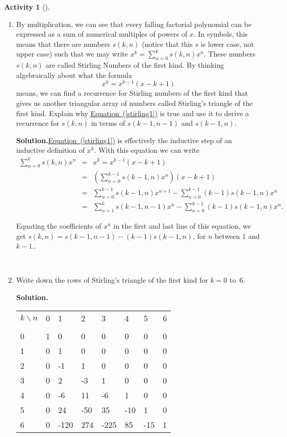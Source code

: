 \documentclass[10pt,]{book}
\theoremstyle{plain}
\theoremstyle{definition}
\newtheorem{activity}[project]{Activity}
\numberwithin{equation}{chapter}
\newcommand{\hrulethin}  {\noalign{\hrule height 0.04em}}
\newcommand{\amp}{&}
\begin{document}
\begin{activity}[]\label{Stirlingfirst}
~\par
\begin{enumerate}[label=(\alph*)]
 \item By multiplication, we can see that every falling factorial polynomial can be expressed as a sum of numerical multiples of powers of \(x\). In symbols, this means that there are numbers \(s(k,n)\) (notice that this \(s\) is lower case, not upper case) such that we may write \(x^{\underline{k}} =
\sum_{n=0}^k s(k,n)x^n\). These numbers \(s(k,n)\) are called Stirling Numbers of the first kind. By thinking algebraically about what the formula%
\begin{equation}
x^{\underline{k}} =
x^{\underline{k-1}}(x-k+1)\label{stirling1}
\end{equation}
means, we can find a recurrence for Stirling numbers of the first kind that gives us another triangular array of numbers called Stirling's triangle of the first kind. Explain why \hyperref[stirling1]{Equation~(\ref{stirling1})} is true and use it to derive a recurrence for \(s(k,n)\) in terms of \(s(k-1,n-1)\) and \(s(k-1,n)\).%
\par\medskip\noindent%
\textbf{Solution.}\quad \hyperref[stirling1]{Equation~(\ref{stirling1})} is effectively the inductive step of an inductive definition of \(x^{\underline{k}}\). With this equation we can write%
\begin{align*}
\sum_{n=0}^k s(k,n)x^n\amp =\amp x^{\underline{k}} =
x^{\underline{k-1}}(x-k+1)\\
\amp =\amp \left(\sum_{n=0}^{k-1}s(k-1,n)x^n\right)(x-k+1)\\
\amp =\amp \sum_{n=0}^{k-1}s(k-1,n)x^{n+1} - \sum_{n=0}^{k-1}(k-1)s(k-1,n)x^n\\
\amp =\amp \sum_{n=1}^k s(k-1,n-1)x^n-\sum_{n=0}^{k-1}(k-1)s(k-1,n)x^n.
\end{align*}
%
\par
Equating the coefficients of \(x^n\) in the first and last line of this equation, we get \(s(k,n) = s(k-1,n-1) -(k-1)s(k-1,n)\), for \(n\) between 1 and \(k-1\)..%

~\par
\item Write down the rows of Stirling's triangle of the first kind for \(k=0\) to~6.%
\par\medskip\noindent%
\textbf{Solution.}\quad \begin{tabular}{llllllll}
\(k\backslash n\)&0&1&2&3&4&5&6\tabularnewline[0pt]
&&&&&&&\tabularnewline\hrulethin
0&1&0&0&0&0&0&0\tabularnewline[0pt]
1&0&1&0&0&0&0&0\tabularnewline[0pt]
2&0&-1&1&0&0&0&0\tabularnewline[0pt]
3&0&2&-3&1&0&0&0\tabularnewline[0pt]
4&0&-6&11&-6&1&0&0\tabularnewline[0pt]
5&0&24&-50&35&-10&1&0\tabularnewline[0pt]
6&0&-120&274&-225&85&-15&1
\end{tabular}

\end{enumerate}
\end{activity}
\end{document}
